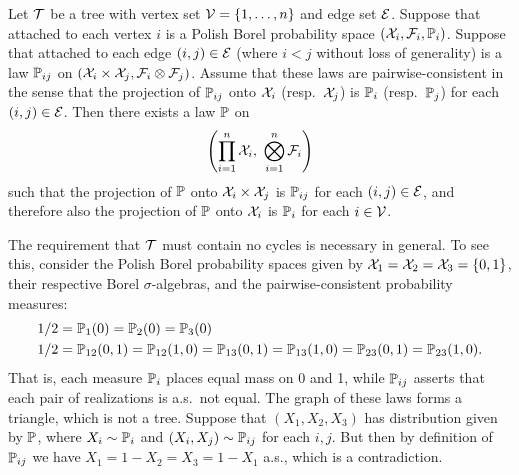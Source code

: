 \begin{lemma}
  \label{lem:vbp}

  Let $\cT$ be a tree
  with vertex set
  $\cV = \{1, \ldots, n\}$
  and edge set $\cE$.
  Suppose that attached to each vertex $i$ is a
  Polish Borel probability space
  $(\cX_i, \cF_i, \P_i)$.
  Suppose that attached to each edge $(i,j) \in \cE$
  (where $i<j$ without loss of generality)
  is a law $\P_{i j}$ on
  $(\cX_i \times \cX_j, \cF_i \otimes \cF_j)$.
  Assume that these laws are pairwise-consistent in the sense that
  the projection of $\P_{i j}$ onto
  $\cX_i$ (resp.\ $\cX_j$) is $\P_i$ (resp.\ $\P_j$)
  for each $(i,j) \in \cE$.
  Then there exists a law $\P$ on
  \begin{align*}
    \left(
      \prod_{i=1}^n \cX_i, \
      \bigotimes_{i=1}^n \cF_i
    \right)
  \end{align*}
  such that the projection of $\P$
  onto $\cX_i \times \cX_j$
  is $\P_{i j}$ for each $(i,j) \in \cE$,
  and therefore also
  the projection of $\P$
  onto $\cX_i$
  is $\P_i$ for each $i \in \cV$.

\end{lemma}

\begin{remark}
  The requirement that $\cT$ must contain no cycles
  is necessary in general.
  To see this, consider the Polish Borel probability spaces
  given by
  $\cX_1 = \cX_2 = \cX_3 = \{0,1\}$,
  their respective Borel $\sigma$-algebras,
  and the pairwise-consistent probability measures:
  \begin{align*}
    1/2
    &=
    \P_1(0) = \P_2(0) = \P_3(0) \\
    1/2
    &=
    \P_{12}(0,1) = \P_{12}(1,0) =
    \P_{13}(0,1) = \P_{13}(1,0) =
    \P_{23}(0,1) = \P_{23}(1,0).
  \end{align*}
  That is, each measure $\P_i$
  places equal mass on 0 and 1,
  while $\P_{i j}$
  asserts that each pair of realizations is a.s.\ not equal.
  The graph of these laws forms a triangle,
  which is not a tree.
  Suppose that $(X_1,X_2,X_3)$ has distribution given by $\P$,
  where $X_i \sim \P_i$ and $(X_i,X_j) \sim \P_{i j}$
  for each $i,j$.
  But then by definition of $\P_{i j}$ we have
  $X_1 = 1-X_2 = X_3 = 1-X_1$ a.s.,
  which is a contradiction.

\end{remark}


